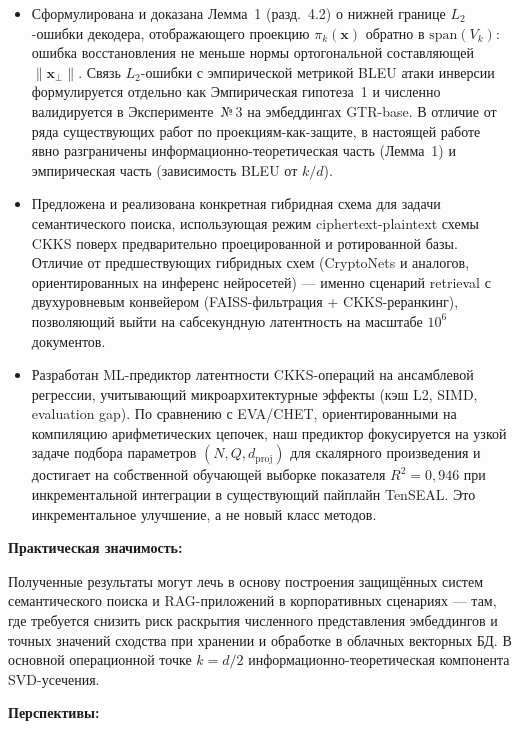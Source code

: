 \documentclass[a4paper, 12pt, oneside, openany]{article}
\begin{document}
\begin{itemize}
	\item
	Сформулирована и доказана Лемма~1 (разд.~4.2) о нижней границе $L_2$-ошибки декодера, отображающего проекцию $\pi_k(\mathbf{x})$ обратно в $\mathrm{span}(V_k)$: ошибка восстановления не меньше нормы ортогональной составляющей $\|\mathbf{x}_{\perp}\|$. Связь $L_2$-ошибки с эмпирической метрикой BLEU атаки инверсии формулируется отдельно как Эмпирическая гипотеза~1 и численно валидируется в Эксперименте~№\,3 на эмбеддингах GTR-base. В отличие от ряда существующих работ по проекциям-как-защите, в настоящей работе явно разграничены информационно-теоретическая часть (Лемма~1) и эмпирическая часть (зависимость BLEU от $k/d$).
	\item
	Предложена и реализована конкретная гибридная схема для задачи семантического поиска, использующая режим ciphertext-plaintext схемы CKKS поверх предварительно проецированной и ротированной базы. Отличие от предшествующих гибридных схем (CryptoNets и аналогов, ориентированных на инференс нейросетей) --- именно сценарий retrieval с двухуровневым конвейером (FAISS-фильтрация + CKKS-реранкинг), позволяющий выйти на сабсекундную латентность на масштабе $10^{6}$ документов.
	\item
	Разработан ML-предиктор латентности CKKS-операций на ансамблевой регрессии, учитывающий микроархитектурные эффекты (кэш L2, SIMD, evaluation gap). По сравнению с EVA/CHET, ориентированными на компиляцию арифметических цепочек, наш предиктор фокусируется на узкой задаче подбора параметров $(N, Q, d_{\mathrm{proj}})$ для скалярного произведения и достигает на собственной обучающей выборке показателя $R^2 = 0{,}946$ при инкрементальной интеграции в существующий пайплайн TenSEAL. Это инкрементальное улучшение, а не новый класс методов.
\end{itemize}

\textbf{Практическая значимость:}

Полученные результаты могут лечь в основу построения защищённых систем семантического поиска и RAG-приложений в корпоративных сценариях --- там, где требуется снизить риск раскрытия численного представления эмбеддингов и точных значений сходства при хранении и обработке в облачных векторных БД. В основной операционной точке $k = d/2$ информационно-теоретическая компонента SVD-усечения.


\textbf{Перспективы:}
\end{document}
